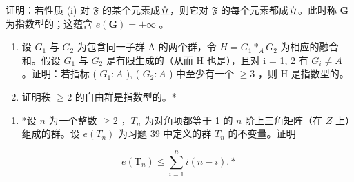 证明：若性质 (i) 对 \(\mathfrak{F}\) 的某个元素成立，则它对 \(\mathfrak{F}\) 的每个元素都成立。此时称 \(\mathbf{G}\) 为指数型的；这蕴含 \(e(\mathbf{G}) = +\infty\) 。

\begin{enumerate}
\def\labelenumi{(\alph{enumi})}
\setcounter{enumi}{5}
\item
  设 \(G_{1}\) 与 \(G_{2}\) 为包含同一子群 A 的两个群，令 \(H = G_{1} *_{A} G_{2}\) 为相应的融合和。假设 \(G_{1}\) 与 \(G_{2}\) 是有限生成的（从而 H 也是），且对 i = 1, 2 有 \(G_{i} \neq A\) 。证明：若指标 ( \(G_{1}:A\) ), ( \(G_{2}:A\) ) 中至少有一个 \(\geqslant 3\) ，则 H 是指数型的。
\item
  证明秩 \(\geqslant 2\) 的自由群是指数型的。*
\end{enumerate}

\begin{enumerate}
\def\labelenumi{\arabic{enumi}.}
\setcounter{enumi}{39}
\tightlist
\item
  *设 \(n\) 为一个整数 \(\geqslant 2\) ，\(T_n\) 为对角项都等于 1 的 \(n\) 阶上三角矩阵（在 \(Z\) 上）组成的群。设 \(e(T_n)\) 为习题 39 中定义的群 \(T_n\) 的不变量。证明
\end{enumerate}

\[
e (\mathrm{T} _ {n}) \leqslant \sum_ {i = 1} ^ {n} i (n - i). *
\]

